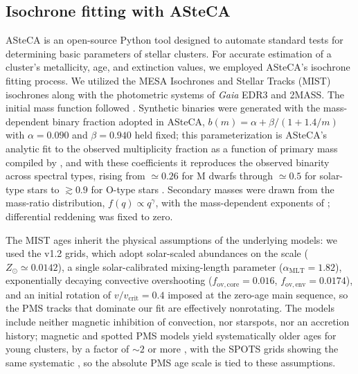 \documentclass{aa}
\begin{document}
\subsection{Isochrone fitting with ASteCA}\label{subsec:asteca}
ASteCA \citep{2015A&A...576A...6P} is an open-source Python tool designed to automate standard tests for determining basic parameters of stellar clusters. For accurate estimation of a cluster's metallicity, age, and extinction values, we employed ASteCA's isochrone fitting process. We utilized the MESA Isochrones and Stellar Tracks (MIST) isochrones \citep{2016ApJS..222....8D, 2016ApJ...823..102C} along with the photometric systems of \textit{Gaia} EDR3 and 2MASS\@. The initial mass function followed \citet{2014ApJ...796...75C}. Synthetic binaries were generated with the mass-dependent binary fraction adopted in ASteCA, $b(m)=\alpha+\beta/(1+1.4/m)$ with $\alpha=0.090$ and $\beta=0.940$ held fixed; this parameterization is ASteCA's analytic fit to the observed multiplicity fraction as a function of primary mass compiled by \citet{2023ASPC..534..275O}, and with these coefficients it reproduces the observed binarity across spectral types, rising from $\simeq0.26$ for M dwarfs through $\simeq0.5$ for solar-type stars to $\gtrsim0.9$ for O-type stars \citep{2013ARA&A..51..269D,2017ApJS..230...15M}. Secondary masses were drawn from the mass-ratio distribution, $f(q)\propto q^{\gamma}$, with the mass-dependent exponents of \citet{2013ARA&A..51..269D}; differential reddening was fixed to zero.

The MIST ages inherit the physical assumptions of the underlying models: we used the v1.2 grids, which adopt solar-scaled abundances on the \citet{2009ARA&A..47..481A} scale ($Z_\odot\simeq0.0142$), a single solar-calibrated mixing-length parameter ($\alpha_{\mathrm{MLT}}=1.82$), exponentially decaying convective overshooting ($f_{\mathrm{ov,core}}=0.016$, $f_{\mathrm{ov,env}}=0.0174$), and an initial rotation of $v/v_{\mathrm{crit}}=0.4$ imposed at the zero-age main sequence, so the PMS tracks that dominate our fit are effectively nonrotating. The models include neither magnetic inhibition of convection, nor starspots, nor an accretion history; magnetic and spotted PMS models yield systematically older ages for young clusters, by a factor of $\sim2$ or more \citep{2016A&A...593A..99F,2015ApJ...807..174S}, with the SPOTS grids showing the same systematic \citep{2020ApJ...891...29S}, so the absolute PMS age scale is tied to these assumptions.
\end{document}
